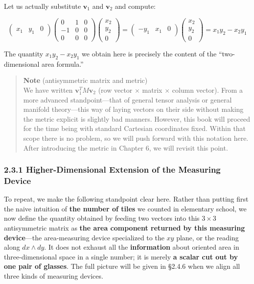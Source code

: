 Let us actually substitute \(\mathbf{v}_1\) and \(\mathbf{v}_2\) and
compute:

\[
\begin{pmatrix} x_1 & y_1 & 0 \end{pmatrix}
\begin{pmatrix}
  0 & 1 & 0 \\
  -1 & 0 & 0 \\
  0 & 0 & 0
\end{pmatrix}
\begin{pmatrix} x_2 \\ y_2 \\ 0 \end{pmatrix}
= \begin{pmatrix} -y_1 & x_1 & 0 \end{pmatrix}
\begin{pmatrix} x_2 \\ y_2 \\ 0 \end{pmatrix}
= x_1 y_2 - x_2 y_1
\]

The quantity \(x_1 y_2 - x_2 y_1\) we obtain here is precisely the
content of the ``two-dimensional area formula.''

\begin{quote}
\textbf{Note} (antisymmetric matrix and metric)\\
We have written \(\mathbf{v}_1^T M \mathbf{v}_2\) (row vector \(\times\)
matrix \(\times\) column vector). From a more advanced standpoint---that
of general tensor analysis or general manifold theory---this way of
laying vectors on their side without making the metric explicit is
slightly bad manners. However, this book will proceed for the time being
with standard Cartesian coordinates fixed. Within that scope there is no
problem, so we will push forward with this notation here. After
introducing the metric in Chapter 6, we will revisit this point.
\end{quote}

\hypertarget{higher-dimensional-extension-of-the-measuring-device}{%
\subsubsection{2.3.1 Higher-Dimensional Extension of the Measuring
Device}\label{higher-dimensional-extension-of-the-measuring-device}}

To repeat, we make the following standpoint clear here. Rather than
putting first the naive intuition of \textbf{the number of tiles} we
counted in elementary school, we now define the quantity obtained by
feeding two vectors into this \(3 \times 3\) antisymmetric matrix as
\textbf{the area component returned by this measuring device}---the
area-measuring device specialized to the \(xy\) plane, or the reading
along \(dx \wedge dy\). It does not exhaust all the \textbf{information}
about oriented area in three-dimensional space in a single number; it is
merely \textbf{a scalar cut out by one pair of glasses}. The full
picture will be given in §2.4.6 when we align all three kinds of
measuring devices.

